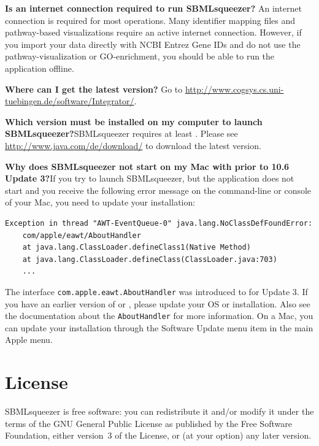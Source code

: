 \noindent \textbf{Is an internet connection required to run SBMLsqueezer?}\newline
An internet connection is required for most operations. Many identifier mapping
files and pathway-based visualizations require an active internet connection.
However, if you import your data directly with NCBI Entrez Gene IDs and do not
use the pathway-visualization or GO-enrichment, you should be able to run the
application offline.\newline

\noindent \textbf{Where can I get the latest version?}\newline
Go to \url{http://www.cogsys.cs.uni-tuebingen.de/software/Integrator/}.\newline

\noindent \textbf{Which \Java version must be installed on my computer to launch
SBMLsqueezer?}\newline SBMLsqueezer requires at least . Please see
\url{http://www.java.com/de/download/} to download the latest \Java version.

\noindent \textbf{Why does SBMLsqueezer not start on my Mac with \MacOSX prior to
10.6 Update 3?}\newline If you try to launch SBMLsqueezer, but the application does
not start and you receive the following error message on the command-line or
\Java console of your Mac, you need to update your \Java installation:
\begin{verbatim}
Exception in thread "AWT-EventQueue-0" java.lang.NoClassDefFoundError:
    com/apple/eawt/AboutHandler
    at java.lang.ClassLoader.defineClass1(Native Method)
    at java.lang.ClassLoader.defineClass(ClassLoader.java:703)
    ...
\end{verbatim}
The interface \texttt{com.apple.eawt.AboutHandler} was introduced to \Java for
 Update 3. If you have an earlier version of \MacOSX or \Java,
please update your OS or \Java installation. Also see the \MacOSX documentation
about the \texttt{AboutHandler} for more information. On a Mac, you can update
your \Java installation through the Software Update menu item in the main Apple
menu.

\chapter{License}

SBMLsqueezer is free software: you can redistribute it and/or modify
it under the terms of the GNU General Public License as published by
the Free Software Foundation, either version~3 of the License, or
(at your option) any later version.

